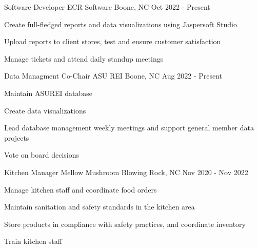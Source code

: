 


\begin{cventries}

  \cventry
    {Software Developer} %
    {ECR Software} %
    {Boone, NC} %
    {Oct 2022 - Present} %
    {
      \begin{cvitems} %
        \item {Create full-fledged reports and data visualizations using Jaspersoft Studio}
        \item {Upload reports to client stores, test and ensure customer satisfaction}
        \item {Manage tickets and attend daily standup meetings}
      \end{cvitems}
    }

  \cventry
    {Data Managment Co-Chair} %
    {ASU REI} %
    {Boone, NC} %
    {Aug 2022 - Present} %
    {
      \begin{cvitems} %
        \item {Maintain ASUREI database}
        \item {Create data visualizations}
        \item {Lead database management weekly meetings and support general member data projects}
        \item {Vote on board decisions}
      \end{cvitems}
    }

\cventry
{Kitchen Manager} %
{Mellow Mushroom} %
{Blowing Rock, NC} %
{Nov 2020 - Nov 2022} %
{
  \begin{cvitems} %
    \item {Manage kitchen staff and coordinate food orders}
    \item {Maintain sanitation and safety standards in the kitchen area}
    \item {Store products in compliance with safety practices, and coordinate inventory}
    \item {Train kitchen staff}
  \end{cvitems}
}


\end{cventries}
